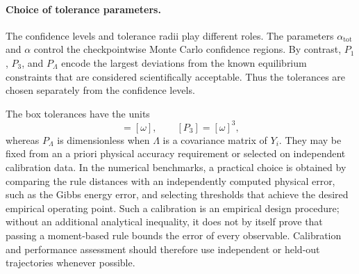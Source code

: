 \documentclass[showpacs,amsmath,amssymb,twocolumn,prx,superscriptaddress,10pt,aps,nofootinbib]{revtex4-2}
\begin{document}


\paragraph{Choice of tolerance parameters.}
The confidence levels and tolerance radii play different roles. The parameters $\alpha_{\mathrm{tot}}$ and $\alpha$ control the checkpointwise Monte Carlo confidence regions. By contrast, $P_1$, $P_3$, and $P_\Lambda$ encode the largest deviations from the known equilibrium constraints that are considered scientifically acceptable. Thus the tolerances are chosen separately from the confidence levels.

The box tolerances have the units
\begin{equation}
    [P_1]=[\omega],
    \qquad
    [P_3]=[\omega]^3,
\end{equation}
whereas $P_\Lambda$ is dimensionless when $\Lambda$ is a covariance matrix of $Y_i$. They may be fixed from an a priori physical accuracy requirement or selected on independent calibration data. In the numerical benchmarks, a practical choice is obtained by comparing the rule distances with an independently computed physical error, such as the Gibbs energy error, and selecting thresholds that achieve the desired empirical operating point. Such a calibration is an empirical design procedure; without an additional analytical inequality, it does not by itself prove that passing a moment-based rule bounds the error of every observable. Calibration and performance assessment should therefore use independent or held-out trajectories whenever possible.
\end{document}
